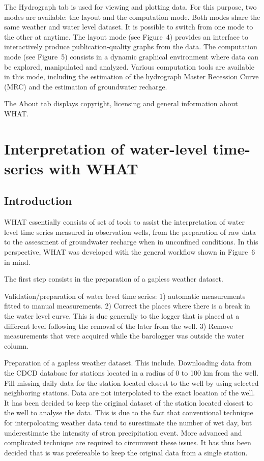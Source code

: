 \documentclass[12pt, letterpaper, fleqn]{report}
\begin{document}
The Hydrograph tab is used for viewing and plotting data. For this purpose, two modes are available: the layout and the computation mode. Both modes share the same weather and water level dataset. It is possible to switch from one mode to the other at anytime. The layout mode (see Figure 4) provides an interface to interactively produce publication-quality graphs from the data. The computation mode (see Figure 5) consists in a dynamic graphical environment where data can be explored, manipulated and analyzed. Various computation tools are available in this mode, including the estimation of the hydrograph Master Recession Curve (MRC) and the estimation of groundwater recharge.

The About tab displays copyright, licensing and general information about WHAT.

\section{Interpretation of water-level time-series with WHAT}

\subsection{Introduction}

WHAT essentially consists of set of tools to assist the interpretation of water level time series measured in observation wells, from the preparation of raw data to the assessment of groundwater recharge when in unconfined conditions. In this perspective, WHAT was developed with the general workflow shown in Figure 6  in mind.

The first step consists in the preparation of a gapless weather dataset.

Validation/preparation of water level time series: 1) automatic measurements fitted to manual measurements. 2) Correct the places where there is a break in the water level curve. This is due generally to the logger that is placed at a different level following the removal of the later from the well. 3) Remove measurements that were acquired while the barologger was outside the water column.

Preparation of a gapless weather dataset. This include. Downloading data from the CDCD database for stations located in a radius of 0 to 100 km from the well. Fill missing daily data for the station located closest to the well by using selected neighboring stations. Data are not interpolated to the exact location of the well. It has been decided to keep the original dataset of the station located closest to the well to analyse the data. This is due to the fact that conventional technique for interpoloating weather data tend to surestimate the number of wet day, but underestimate the intensity of stron precipitation event. More advanced and complicated technique are required to circumvent these issues. It has thus been decided that is was prefereable to keep the original data from a single station.
\end{document}
